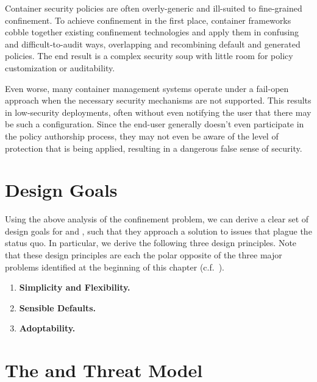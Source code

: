 \begin{inprogress}
  Container security policies are often overly-generic and ill-suited to fine-grained
  confinement. To achieve confinement in the first place, container frameworks cobble
  together existing confinement technologies and apply them in confusing and
  difficult-to-audit ways, overlapping and recombining default and generated policies. The
  end result is a complex security soup with little room for policy customization or
  auditability. 

  Even worse, many container management systems operate under a fail-open approach when the
  necessary security mechanisms are not supported. This results in low-security deployments,
  often without even notifying the user that there may be such a configuration. Since the
  end-user generally doesn't even participate in the policy authorship process, they may not
  even be aware of the level of protection that is being applied, resulting in a dangerous
  false sense of security. 
\end{inprogress}




\section{Design Goals}%
\label{s:design-goals}

Using the above analysis of the confinement problem, we can derive a clear set of design
goals for \bpfbox{} and \bpfcontain{}, such that they approach a solution to issues that
plague the status quo. In particular, we derive the following three design principles.
Note that these design principles are each the polar opposite of the three major problems
identified at the beginning of this chapter (c.f.~).

\begin{enumerate}
  \item \textbf{Simplicity and Flexibility.}

  \item \textbf{Sensible Defaults.}

  \item \textbf{Adoptability.}
\end{enumerate}



\section{The \bpfbox{} and \bpfcontain{} Threat Model}%
\label{s:threat-model}
